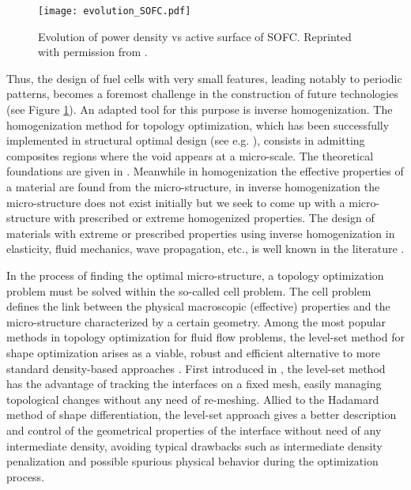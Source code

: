 \documentclass{article}
\begin{document}
\begin{figure}[h]
\centering
\texttt{[image: evolution\_SOFC.pdf]}
\caption{Evolution of power density vs active surface of SOFC. Reprinted with permission from \cite{etienne}.}\label{evolution}
\end{figure}

Thus, the design of fuel cells with very small features, leading notably to periodic patterns, becomes a foremost challenge in the construction of future technologies (see Figure \ref{evolution}). An adapted tool for this purpose is inverse homogenization. The homogenization method for topology optimization, which has been successfully implemented in structural optimal design (see e.g. \cite{allaire2002shape,bendsoe1995methods,cherkaev2000variational,allaire1993optimal,bendsoe1988generating}), consists in admitting composites regions where the void appears at a micro-scale. The theoretical foundations are given in \cite{kohn1986optimal,tartar2009general}. 
Meanwhile in homogenization the effective properties of a material are found from the micro-structure, in inverse homogenization the micro-structure does not exist initially but we seek to come up with a micro-structure with prescribed or extreme homogenized properties. The design of materials with extreme or prescribed properties using inverse homogenization in elasticity, fluid mechanics, wave propagation, etc., is well known in the literature \cite{cadman2013design,sigmund1994materials,sigmund1994design,haslinger1995optimum,sigmund1997design,zhou2008computational,guest2007design,bendsoe2004topology}.

In the process of finding the optimal micro-structure, a topology optimization problem must be solved within the so-called cell problem. The cell problem defines the link between the physical macroscopic (effective) properties and the micro-structure characterized by a certain geometry. Among the most popular methods in topology optimization for fluid flow problems, the level-set method for shape optimization \cite{allaire2004structural,burger2003framework,sethian2000structural,wang2003level} arises as a viable, robust and efficient alternative to more standard density-based approaches \cite{allaire2002shape,allaire1997shape,bendsoe1995methods}. First introduced in \cite{osher.sethian}, the level-set method has the advantage of tracking the interfaces on a fixed mesh, easily managing topological changes without any need of re-meshing. Allied to the Hadamard method of shape differentiation, the level-set approach gives a better description and control of the geometrical properties of the interface without need of any intermediate density, avoiding typical drawbacks such as intermediate density penalization and possible spurious physical behavior during the optimization process.
\end{document}
